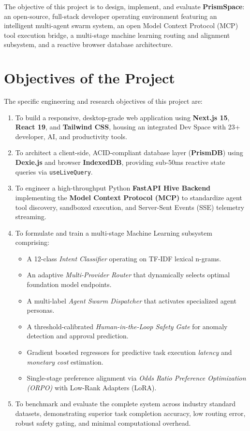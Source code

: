 \documentclass[12pt,a4paper]{report}
\begin{document}
The objective of this project is to design, implement, and evaluate \textbf{PrismSpace}: an open-source, full-stack developer operating environment featuring an intelligent multi-agent swarm system, an open Model Context Protocol (MCP) tool execution bridge, a multi-stage machine learning routing and alignment subsystem, and a reactive browser database architecture.

\section{Objectives of the Project}
The specific engineering and research objectives of this project are:
\begin{enumerate}
    \item To build a responsive, desktop-grade web application using \textbf{Next.js 15}, \textbf{React 19}, and \textbf{Tailwind CSS}, housing an integrated Dev Space with 23+ developer, AI, and productivity tools.
    \item To architect a client-side, ACID-compliant database layer (\textbf{PrismDB}) using \textbf{Dexie.js} and browser \textbf{IndexedDB}, providing sub-50ms reactive state queries via \texttt{useLiveQuery}.
    \item To engineer a high-throughput Python \textbf{FastAPI Hive Backend} implementing the \textbf{Model Context Protocol (MCP)} to standardize agent tool discovery, sandboxed execution, and Server-Sent Events (SSE) telemetry streaming.
    \item To formulate and train a multi-stage Machine Learning subsystem comprising:
    \begin{itemize}
        \item A 12-class \textit{Intent Classifier} operating on TF-IDF lexical n-grams.
        \item An adaptive \textit{Multi-Provider Router} that dynamically selects optimal foundation model endpoints.
        \item A multi-label \textit{Agent Swarm Dispatcher} that activates specialized agent personas.
        \item A threshold-calibrated \textit{Human-in-the-Loop Safety Gate} for anomaly detection and approval prediction.
        \item Gradient boosted regressors for predictive task execution \textit{latency} and \textit{monetary cost} estimation.
        \item Single-stage preference alignment via \textit{Odds Ratio Preference Optimization (ORPO)} with Low-Rank Adapters (LoRA).
    \end{itemize}
    \item To benchmark and evaluate the complete system across industry standard datasets, demonstrating superior task completion accuracy, low routing error, robust safety gating, and minimal computational overhead.
\end{enumerate}
\end{document}
